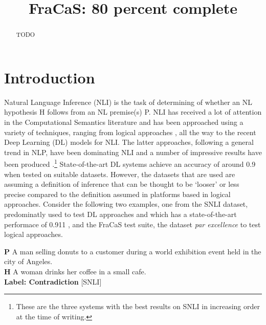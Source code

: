 \documentclass[11pt]{article}
\title{FraCaS: 80 percent complete}
\begin{document}
\maketitle{}

\begin{abstract}
  TODO
\end{abstract}
\section{Introduction}
Natural Language Inference (NLI) is the task of determining of whether
an NL hypothesis H follows from an NL premise(s) P. NLI has received a
lot of attention in the Computational Semantics literature and has
been approached using a variety of techniques, ranging from logical
approaches
\citep{bos:2008,Mineshima:2015,Abzianidze:2015,bernardy_type_2017},
all the way to the recent Deep Learning (DL) models for NLI. The
latter approaches, following a general trend in NLP, have been
dominating NLI and a number of impressive results have been
produced \citep{kim:2018,radford:2018,liu:2019}.\footnote{These are
  the three systems with the best results on SNLI in increasing
  order at the time of writing.}  State-of-the-art DL systems achieve an accuracy of around
0.9 when tested on suitable datasets. However, the datasets that are
used are assuming a definition of inference that can be thought to be
`looser' or less precise compared to the definition assumed in
platforms based in logical approaches. Consider the following
two examples, one from the SNLI dataset, predominatly used to test DL
approaches and which has a state-of-the-art performace of 0.911
\citet{liu:2019}, and the FraCaS test suite, the dataset \textit{par
  excellence} to test logical approaches.
%
\begin{lingex}
\item %
  \label{ex:snli}
\textbf{P}  A  man selling donuts to a customer during a world
exhibition event held in the city of Angeles. \\
 \textbf{H}  A woman drinks her coffee in a small cafe.\\
\textbf{Label: Contradiction} [SNLI]
\end{lingex}
\end{document}
